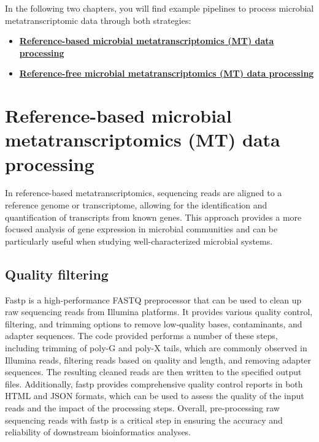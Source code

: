 \documentclass[
]{book}
\providecommand{\tightlist}{%
  \setlength{\itemsep}{0pt}\setlength{\parskip}{0pt}}
\begin{document}
In the following two chapters, you will find example pipelines to process microbial metatranscriptomic data through both strategies:

\begin{itemize}
\tightlist
\item
  \textbf{\protect\hyperlink{microbial-metatranscriptomics-data-processing-reference-based}{Reference-based microbial metatranscriptomics (MT) data processing}}
\item
  \textbf{\protect\hyperlink{microbial-metatranscriptomics-data-processing-reference-free}{Reference-free microbial metatranscriptomics (MT) data processing}}
\end{itemize}

\hypertarget{microbial-metatranscriptomics-data-processing-reference-based}{%
\section{Reference-based microbial metatranscriptomics (MT) data processing}\label{microbial-metatranscriptomics-data-processing-reference-based}}

In reference-based metatranscriptomics, sequencing reads are aligned to a reference genome or transcriptome, allowing for the identification and quantification of transcripts from known genes. This approach provides a more focused analysis of gene expression in microbial communities and can be particularly useful when studying well-characterized microbial systems.

\hypertarget{quality-filtering-1}{%
\subsection*{Quality filtering}\label{quality-filtering-1}}

Fastp is a high-performance FASTQ preprocessor that can be used to clean up raw sequencing reads from Illumina platforms. It provides various quality control, filtering, and trimming options to remove low-quality bases, contaminants, and adapter sequences. The code provided performs a number of these steps, including trimming of poly-G and poly-X tails, which are commonly observed in Illumina reads, filtering reads based on quality and length, and removing adapter sequences. The resulting cleaned reads are then written to the specified output files. Additionally, fastp provides comprehensive quality control reports in both HTML and JSON formats, which can be used to assess the quality of the input reads and the impact of the processing steps. Overall, pre-processing raw sequencing reads with fastp is a critical step in ensuring the accuracy and reliability of downstream bioinformatics analyses.
\end{document}
